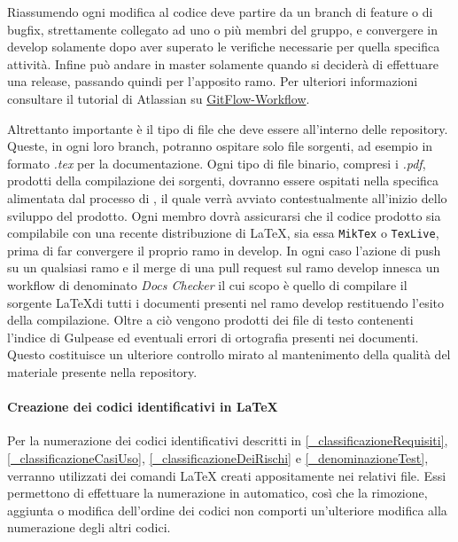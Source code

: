 Riassumendo ogni modifica al codice deve partire da un branch di feature o di bugfix, strettamente collegato ad uno o più membri del gruppo, e convergere in develop solamente dopo
aver superato le verifiche necessarie per quella specifica attività.
Infine può andare in master solamente quando si deciderà di effettuare una release, passando quindi per l'apposito ramo.
Per ulteriori informazioni consultare il tutorial di Atlassian su \href{https://www.atlassian.com/git/tutorials/comparing-workflows/gitflow-workflow}{GitFlow-Workflow}.

Altrettanto importante è il tipo di file che deve essere all'interno delle repository. Queste, in ogni loro branch, potranno ospitare solo file sorgenti, ad esempio
in formato \textit{.tex} per la documentazione. Ogni tipo di file binario, compresi i \textit{.pdf}, prodotti della compilazione dei sorgenti, dovranno essere
ospitati nella specifica \textit{} alimentata dal processo di \textit{}, il quale verrà avviato contestualmente
all'inizio dello sviluppo del prodotto. Ogni membro dovrà assicurarsi che il codice prodotto sia compilabile con una recente distribuzione di \LaTeX,
sia essa \verb|MikTex| o \verb|TexLive|, prima di far convergere il proprio ramo in develop. In ogni caso l'azione di push su un qualsiasi ramo e il merge di una pull request sul ramo develop
innesca un workflow di  denominato \textit{Docs Checker} il cui scopo è quello di compilare il sorgente \LaTeX di tutti i documenti presenti nel ramo develop
restituendo l'esito della compilazione. Oltre a ciò vengono prodotti dei file di testo contenenti l'indice di Gulpease ed eventuali errori di ortografia presenti nei documenti.
Questo costituisce un ulteriore controllo mirato al mantenimento della qualità del materiale presente nella repository.

\paragraph{Creazione dei codici identificativi in \LaTeX} \label{_numerazioneCodiciIdentificativi}
Per la numerazione dei codici identificativi descritti in \ref{_classificazioneRequisiti}, \ref{_classificazioneCasiUso}, \ref{_classificazioneDeiRischi} e \ref{_denominazioneTest}, verranno utilizzati dei comandi \LaTeX{} creati appositamente nei relativi file. Essi permettono di effettuare la numerazione in automatico, così che la rimozione, aggiunta o modifica dell'ordine dei codici non comporti un'ulteriore modifica alla numerazione degli altri codici.



